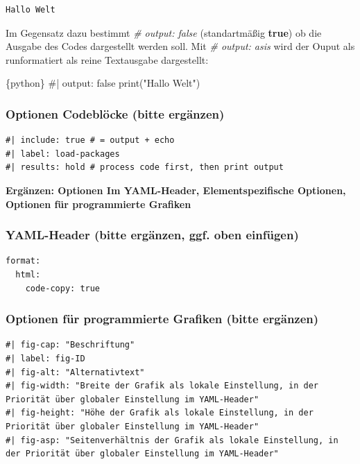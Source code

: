 \documentclass[
  letterpaper,
  DIV=11]{scrartcl}
\newenvironment{Shaded}{\begin{snugshade}}{\end{snugshade}}
\newcommand{\InformationTok}[1]{\textcolor[rgb]{0.37,0.37,0.37}{#1}}
\begin{document}
\begin{verbatim}
Hallo Welt
\end{verbatim}

Im Gegensatz dazu bestimmt \emph{\#\textbar{} output: false}
(standartmäßig \textbf{true}) ob die Ausgabe des Codes dargestellt
werden soll. Mit \emph{\#\textbar{} output: asis} wird der Ouput als
runformatiert als reine Textausgabe dargestellt:

\begin{Shaded}
\begin{Highlighting}[]
\InformationTok{\textasciigrave{}\textasciigrave{}\textasciigrave{}\{python\}}
\InformationTok{\#| output: false}
\InformationTok{print("Hallo Welt")}
\InformationTok{\textasciigrave{}\textasciigrave{}\textasciigrave{}}
\end{Highlighting}
\end{Shaded}

\subsubsection{Optionen Codeblöcke (bitte
ergänzen)}\label{optionen-codebluxf6cke-bitte-erguxe4nzen}

\begin{verbatim}
#| include: true # = output + echo
#| label: load-packages
#| results: hold # process code first, then print output
\end{verbatim}

\textbf{Ergänzen: Optionen Im YAML-Header, Elementspezifische Optionen,
Optionen für programmierte Grafiken}

\subsubsection{YAML-Header (bitte ergänzen, ggf. oben
einfügen)}\label{yaml-header-bitte-erguxe4nzen-ggf.-oben-einfuxfcgen}

\begin{verbatim}
format:
  html:
    code-copy: true
\end{verbatim}

\subsubsection{Optionen für programmierte Grafiken (bitte
ergänzen)}\label{optionen-fuxfcr-programmierte-grafiken-bitte-erguxe4nzen}

\begin{verbatim}
#| fig-cap: "Beschriftung"
#| label: fig-ID
#| fig-alt: "Alternativtext"
#| fig-width: "Breite der Grafik als lokale Einstellung, in der Priorität über globaler Einstellung im YAML-Header"
#| fig-height: "Höhe der Grafik als lokale Einstellung, in der Priorität über globaler Einstellung im YAML-Header"
#| fig-asp: "Seitenverhältnis der Grafik als lokale Einstellung, in der Priorität über globaler Einstellung im YAML-Header"
\end{verbatim}
\end{document}
